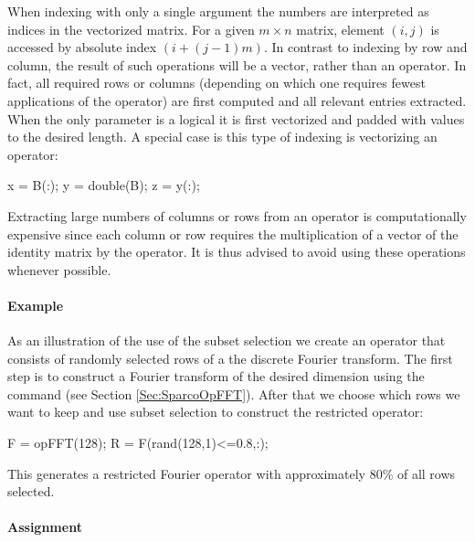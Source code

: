 When indexing with only a single argument the numbers are interpreted
as indices in the vectorized matrix. For a given $m\times n$ matrix,
element $(i,j)$ is accessed by absolute index $(i + (j-1)m)$. In
contrast to indexing by row and column, the result of such operations
will be a vector, rather than an operator. In fact, all required
rows or columns (depending on which one requires fewest applications
of the operator) are first computed and all relevant entries
extracted. When the only parameter is a logical it is first vectorized
and padded with  values to the desired length.
A special case is this type of indexing is vectorizing an operator:
\begin{codeblock}
x = B(:); %
y = double(B);
z = y(:); %
\end{codeblock}
Extracting large numbers of columns or rows from an operator is
computationally expensive since each column or row requires the
multiplication of a vector of the identity matrix by the operator. It
is thus advised to avoid using these operations whenever possible.

\paragraph{Example}

As an illustration of the use of the subset selection we create an
operator that consists of randomly selected rows of a the discrete
Fourier transform. The first step is to construct a Fourier transform
of the desired dimension using the  command (see Section
\ref{Sec:SparcoOpFFT}). After that we choose which rows we want to keep
and use subset selection to construct the restricted operator:
\begin{codeblock}
F = opFFT(128);
R = F(rand(128,1)<=0.8,:);
\end{codeblock}
This generates a restricted Fourier operator with approximately 80\%
of all rows selected.

\paragraph{Assignment}

